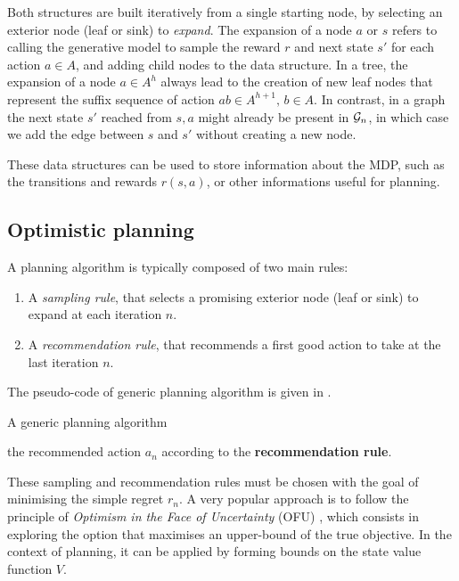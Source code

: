 \documentclass[runningheads]{llncs}
\begin{document}
Both structures are built iteratively from a single starting node, by selecting an exterior node (leaf or sink) to \emph{expand}. The expansion of a node $a$ or $s$ refers to calling the generative model to sample the reward $r$ and next state $s'$ for each action $a\in A$, and adding child nodes to the data structure. In a tree, the expansion of a node $a\in A^h$ always lead to the creation of new leaf nodes that represent the suffix sequence of action $ab\in A^{h+1},\, b\in A$. In contrast, in a graph the next state $s'$ reached from $s,a$ might already be present in $\mathcal{G}_n$, in which case we add the edge between $s$ and $s'$ without creating a new node.

These data structures can be used to store information about the MDP, such as the transitions and rewards $r(s, a)$, or other informations useful for planning.


\subsection{Optimistic planning}

A planning algorithm is typically composed of two main rules:
\begin{enumerate}
	\item A \emph{sampling rule}, that selects a promising exterior node (leaf or sink) to expand at each iteration $n$.
	\item A \emph{recommendation rule}, that recommends a first good action to take at the last iteration $n$.
\end{enumerate}
The pseudo-code of generic planning algorithm is given in .
\begin{algorithm}
	\caption{A generic planning algorithm}
	\label{alg:generic}
	\DontPrintSemicolon
	\Return the recommended action $a_{n}$ according to the \textbf{recommendation rule}.\;
\end{algorithm}

These sampling and recommendation rules must be chosen with the goal of minimising the simple regret $r_n$.
A very popular approach is to follow the principle of \emph{Optimism in the Face of Uncertainty} (OFU) \citep{SurveyRemiMCTS}, which consists in exploring the option that maximises an upper-bound of the true objective. In the context of planning, it can be applied by forming bounds on the state value function $V$.
\end{document}
